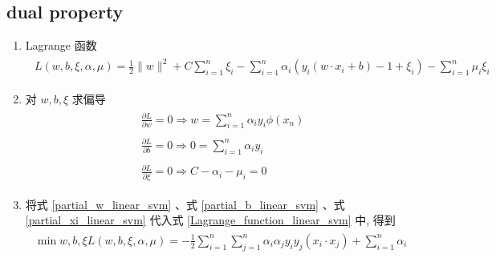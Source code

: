 \documentclass[oneside, 12pt]{ctexbook}
\begin{document}
			\subsection{\quad dual property}
				\begin{enumerate}
					\item Lagrange 函数
						\begin{align}
							\begin{split}
								L(w,b,\xi,\alpha,\mu) = \frac{1}{2} \parallel w \parallel^2 + C\sum_{i=1}^{n}\xi_i - \sum_{i=1}^{n}\alpha_i(y_i(w \cdot x_i + b) - 1 + \xi_i) - \sum_{i=1}^{n}\mu_i \xi_i
							\end{split} \label{Lagrange_function_linear_svm}
						\end{align}
						
					\item 对 $w,b,\xi$ 求偏导
						\begin{align}
							\begin{split}
								&\frac{\partial L}{\partial w} = 0 \Rightarrow w = \sum_{i=1}^{n} \alpha_i y_i \phi(x_n) 
							\end{split} \label{partial_w_linear_svm}\\
							\begin{split}
								&\frac{\partial L}{\partial b} = 0 \Rightarrow 0 = \sum_{i=1}^{n} \alpha_i y_i 
							\end{split} \label{partial_b_linear_svm}\\
							\begin{split}
								&\frac{\partial L}{\partial \xi} = 0 \Rightarrow C - \alpha_i - \mu_i = 0 
							\end{split} \label{partial_xi_linear_svm}
						\end{align}
						
					\item 将式 \ref{partial_w_linear_svm} 、式 \ref{partial_b_linear_svm} 、式 \ref{partial_xi_linear_svm} 代入式 \ref{Lagrange_function_linear_svm} 中, 得到
						\begin{align}
							\begin{split}
								\min\limits{w,b,\xi} L(w,b,\xi,\alpha,\mu) = - \frac{1}{2}\sum_{i=1}^{n}\sum_{j=1}^{n} \alpha_i\alpha_j y_i y_j (x_i \cdot x_j) + \sum_{i=1}^{n}\alpha_i
							\end{split} \label{dual_Lagrange_function_linear_svm}
						\end{align}
						

\end{enumerate}
\end{document}
